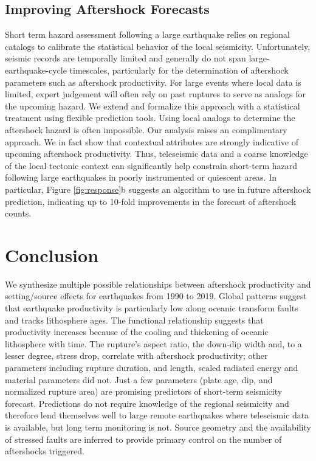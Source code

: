 \documentclass[draft, jgrga]{agujournal2018}
\begin{document}
\subsection{Improving Aftershock Forecasts}

Short term hazard assessment following a large earthquake relies on regional catalogs to calibrate the statistical behavior of the local seismicity. Unfortunately, seismic records are temporally limited and generally do not span large-earthquake-cycle timescales, particularly for the determination of aftershock parameters such as aftershock productivity. For large events where local data is limited, expert judgement will often rely on past ruptures to serve as analogs for the upcoming hazard. We extend and formalize this approach with a statistical treatment using flexible prediction tools. Using local analogs to determine the aftershock hazard is often impossible. Our analysis raises an complimentary approach. We in fact show that contextual attributes are strongly indicative of upcoming aftershock productivity. Thus, teleseismic data and a coarse knowledge of the local tectonic context can significantly help constrain short-term hazard following large earthquakes in poorly instrumented or quiescent areas. In particular, Figure \ref{fig:response}b suggests an algorithm to use in future aftershock prediction, indicating up to 10-fold improvements in the forecast of aftershock counts.

\section{Conclusion}

We synthesize multiple possible relationships between aftershock productivity and setting/source effects for earthquakes from 1990 to 2019. Global patterns suggest that earthquake productivity is particularly low along oceanic transform faults and tracks lithosphere ages. The functional relationship suggests that productivity increases because of the cooling and thickening of oceanic lithosphere with time. The rupture's aspect ratio, the down-dip width and, to a lesser degree, stress drop, correlate with aftershock productivity; other parameters including rupture duration, and length, scaled radiated energy and material parameters did not. Just a few parameters (plate age, dip, and normalized rupture area) are promising predictors of short-term seismicity forecast. Predictions do not require knowledge of the regional seismicity and therefore lend themselves well to large remote earthquakes where teleseismic data is available, but long term monitoring is not. Source geometry and the availability of stressed faults are inferred to provide primary control on the number of aftershocks triggered.
\end{document}
